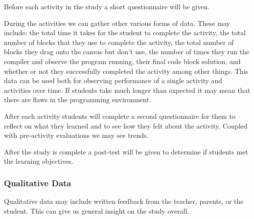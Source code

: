     Before each activity in the study a short questionnaire will be given. 

    During the activities we can gather other various forms of data. These may include: the total time it takes for the student to complete the activity, the total number of blocks that they use to complete the activity, the total number of blocks they drag onto the canvas but don't use, the number of times they run the compiler and observe the program running, their final code block solution, and whether or not they successfully completed the activity among other things. %
    This data can be used both for observing performance of a single activity and activities over time. 
    If students take much longer than expected it may mean that there are flaws in the programming environment. %
    
    After each activity students will complete a second questionnaire for them to reflect on what they learned and to see how they felt about the activity. %
    Coupled with pre-activity evaluations we may see trends. %

    After the study is complete a post-test will be given to determine if students met the learning objectives. 

    \subsubsection*{Qualitative Data}
    Qualitative data may include written feedback from the teacher, parents, or the student. This can give us general insight on the study overall. %
    
